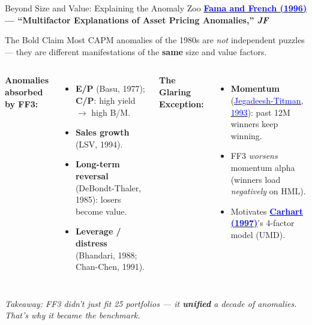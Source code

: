 \documentclass{beamer}
\begin{document}
\begin{frame}{Beyond Size and Value: Explaining the Anomaly Zoo}
	\small
	\textbf{\href{https://doi.org/10.1111/j.1540-6261.1996.tb05202.x}{\textcolor{blue}{Fama and French (1996)}} --- ``Multifactor Explanations of Asset Pricing Anomalies,'' \textit{JF}}
	\begin{block}{The Bold Claim}
		Most CAPM anomalies of the 1980s are \textit{not} independent puzzles --- they are different manifestations of the \textbf{same} size and value factors.
	\end{block}
	\begin{columns}
		\textbf{Anomalies absorbed by FF3:}
		\begin{itemize}\setlength\itemsep{1pt}
			\item \textbf{E/P} (Basu, 1977); \textbf{C/P}: high yield $\to$ high B/M.
			\item \textbf{Sales growth} (LSV, 1994).
			\item \textbf{Long-term reversal} (DeBondt-Thaler, 1985): losers become value.
			\item \textbf{Leverage / distress} (Bhandari, 1988; Chan-Chen, 1991).
		\end{itemize}
		\textbf{The Glaring Exception:}
		\begin{itemize}\setlength\itemsep{1pt}
			\item \textbf{Momentum} (\href{https://doi.org/10.1111/j.1540-6261.1993.tb04702.x}{\textcolor{blue}{Jegadeesh-Titman, 1993}}): past 12M winners keep winning.
			\item FF3 \textit{worsens} momentum alpha (winners load \textit{negatively} on HML).
			\item Motivates \textbf{\href{https://doi.org/10.1111/j.1540-6261.1997.tb03808.x}{\textcolor{blue}{Carhart (1997)}}}'s 4-factor model (UMD).
		\end{itemize}
	\end{columns}
	\vspace{3pt}
	\footnotesize \textit{Takeaway: FF3 didn't just fit 25 portfolios --- it \textbf{unified} a decade of anomalies. That's why it became the benchmark.}
\end{frame}
\end{document}
